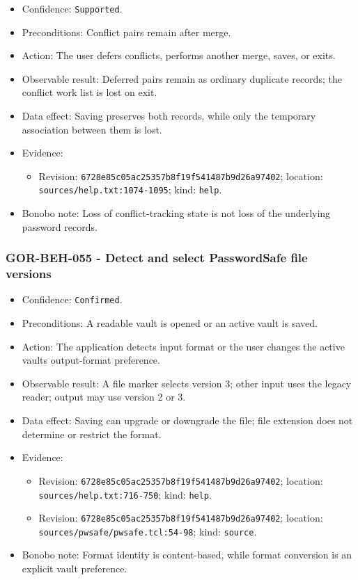 \documentclass[
  letterpaper,
]{article}
\newcommand{\passthrough}[1]{#1}
\providecommand{\tightlist}{%
  \setlength{\itemsep}{0pt}\setlength{\parskip}{0pt}}
\begin{document}
\begin{itemize}
\tightlist
\item
  Confidence: \passthrough{\lstinline!Supported!}.
\item
  Preconditions: Conflict pairs remain after merge.
\item
  Action: The user defers conflicts, performs another merge, saves, or exits.
\item
  Observable result: Deferred pairs remain as ordinary duplicate records; the conflict work list is lost on exit.
\item
  Data effect: Saving preserves both records, while only the temporary association between them is lost.
\item
  Evidence:

  \begin{itemize}
  \tightlist
  \item
    Revision: \nolinkurl{6728e85c05ac25357b8f19f541487b9d26a97402}; location: \nolinkurl{sources/help.txt:1074-1095};
    kind: \passthrough{\lstinline!help!}.
  \end{itemize}
\item
  Bonobo note: Loss of conflict-tracking state is not loss of the underlying password records.
\end{itemize}

\subsubsection{GOR-BEH-055 - Detect and select PasswordSafe file
versions}\label{gor-beh-055---detect-and-select-passwordsafe-file-versions}

\begin{itemize}
\tightlist
\item
  Confidence: \passthrough{\lstinline!Confirmed!}.
\item
  Preconditions: A readable vault is opened or an active vault is saved.
\item
  Action: The application detects input format or the user changes the active vault\textquotesingle s output-format
  preference.
\item
  Observable result: A file marker selects version 3; other input uses the legacy reader; output may use version 2 or 3.
\item
  Data effect: Saving can upgrade or downgrade the file; file extension does not determine or restrict the format.
\item
  Evidence:

  \begin{itemize}
  \tightlist
  \item
    Revision: \nolinkurl{6728e85c05ac25357b8f19f541487b9d26a97402}; location: \nolinkurl{sources/help.txt:716-750};
    kind: \passthrough{\lstinline!help!}.
  \item
    Revision: \nolinkurl{6728e85c05ac25357b8f19f541487b9d26a97402}; location:
    \nolinkurl{sources/pwsafe/pwsafe.tcl:54-98}; kind: \passthrough{\lstinline!source!}.
  \end{itemize}
\item
  Bonobo note: Format identity is content-based, while format conversion is an explicit vault preference.
\end{itemize}
\end{document}

